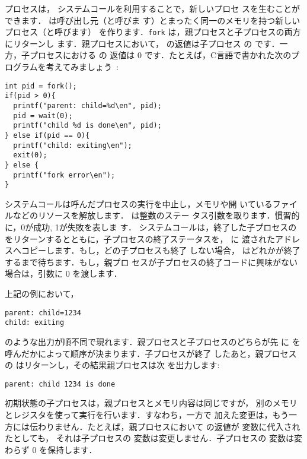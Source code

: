 プロセスは， システムコールを利用することで，新しいプロセ
スを生むことができます． は呼び出し元（と呼びま
す）とまったく同一のメモリを持つ新しいプロセス（と呼びます）
を作ります．\lstinline{fork} は，親プロセスと子プロセスの両方にリターンし
ます．親プロセスにおいて， の返値は子プロセス
の  です．一方，子プロセスにおける  の
返値は 0 です．たとえば，C言語で書かれた次のプログラムを考えてみましょう~\cite{kernighan}:
%
\begin{lstlisting}[]
int pid = fork();
if(pid > 0){
  printf("parent: child=%d\en", pid);
  pid = wait(0);
  printf("child %d is done\en", pid);
} else if(pid == 0){
  printf("child: exiting\en");
  exit(0);
} else {
  printf("fork error\en");
}
\end{lstlisting}
 システムコールは呼んだプロセスの実行を中止し，メモリや開
いているファイルなどのリソースを解放します． は整数のステー
タス引数を取ります．慣習的に，0が成功, 1が失敗を表しま
す． システムコールは，終了した子プロセスの 
をリターンするとともに，子プロセスの終了ステータスを， に
渡されたアドレスへコピーします．もし，どの子プロセスも終了
しない場合， はどれかが終了するまで待ちます．もし，親プロ
セスが子プロセスの終了コードに興味がない場合は，引数に 0 を渡します．


上記の例において，
\begin{lstlisting}[]
parent: child=1234
child: exiting
\end{lstlisting}
のような出力が順不同で現れます．親プロセスと子プロセスのどちらが先
に  を呼んだかによって順序が決まります．子プロセスが終了
したあと，親プロセスの  はリターンし，その結果親プロセスは次
を出力します:
\begin{lstlisting}[]
parent: child 1234 is done
\end{lstlisting}
初期状態の子プロセスは，親プロセスとメモリ内容は同じですが，
別のメモリとレジスタを使って実行を行います．すなわち，一方で
加えた変更は，もう一方には伝わりません．たとえば，親プロセスにおいて
 の返値が  変数に代入されたとしても，
それは子プロセスの  変数は変更しません．子プロセスの
 変数は変わらず 0 を保持します．

